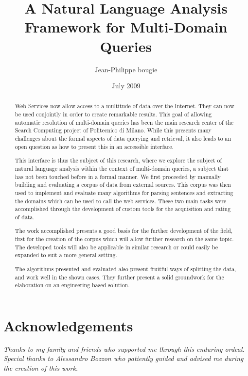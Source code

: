 \documentclass[a4paper]{report}
\begin{document}
\onehalfspacing

\title{A Natural Language Analysis Framework for Multi-Domain Queries}
\author{Jean-Philippe bougie}
\date{July 2009}



\tableofcontents
\listoffigures
\listoftables

\chapter*{Acknowledgements}
\begin{flushright}
  \emph{Thanks to my family and friends who supported me through this enduring ordeal.}\\[1cm]
  \emph{Special thanks to Alessandro Bozzon who patiently guided and advised me during the creation of this work.}
\end{flushright}

\begin{abstract}
  Web Services now allow access to a multitude of data over the Internet. They can now be used conjointly in order to create remarkable results. This goal of allowing automatic resolution of multi-domain queries has been the main research center of the Search Computing project of Politecnico di Milano. While this presents many challenges about the formal aspects of data querying and retrieval, it also leads to an open question as how to present this in an accessible interface.
  
  This interface is thus the subject of this research, where we explore the subject of natural language analysis within the context of multi-domain queries, a subject that has not been touched before in a formal manner.
  We first proceeded by manually building and evaluating a corpus of data from external sources. This corpus was then used to implement and evaluate many algorithms for parsing sentences and extracting the domains which can be used to call the web services. These two main tasks were accomplished through the development of custom tools for the acquisition and rating of data.
  
  The work accomplished presents a good basis for the further development of the field, first for the creation of the corpus which will allow further research on the same topic. The developed tools will also be applicable in similar research or could easily be expanded to suit a more general setting.
  
  The algorithms presented and evaluated also present fruitful ways of splitting the data, and work well in the shown cases. They further present a solid groundwork for the elaboration on an engineering-based solution.
\end{abstract}

















\end{document}
